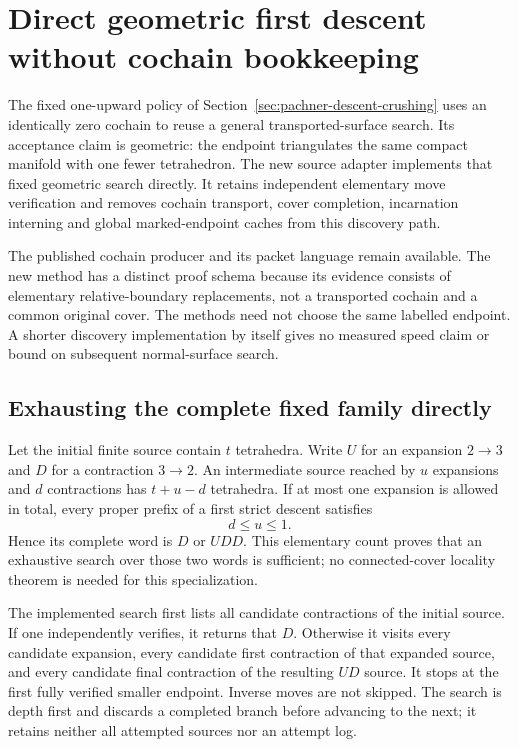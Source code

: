\section{Direct geometric first descent without cochain bookkeeping}
\label{sec:geometric-descent-crushing}

The fixed one-upward policy of
Section~\ref{sec:pachner-descent-crushing} uses an identically zero
cochain to reuse a general transported-surface search.  Its acceptance
claim is geometric: the endpoint triangulates the same compact manifold
with one fewer tetrahedron.  The new source adapter
 implements that fixed geometric
search directly.  It retains independent elementary move verification
and removes cochain transport, cover completion, incarnation interning
and global marked-endpoint caches from this discovery path.

The published cochain producer and its packet language remain available.
The new method has a distinct proof schema because its evidence consists
of elementary relative-boundary replacements, not a transported cochain
and a common original cover.  The methods need not choose the same
labelled endpoint.  A shorter discovery implementation by itself gives
no measured speed claim or bound on subsequent normal-surface search.

\subsection{Exhausting the complete fixed family directly}

Let the initial finite source contain $t$ tetrahedra.  Write $U$ for an
expansion $2\to3$ and $D$ for a contraction $3\to2$.  An intermediate
source reached by $u$ expansions and $d$ contractions has $t+u-d$
tetrahedra.  If at most one expansion is allowed in total, every proper
prefix of a first strict descent satisfies
\[
                              d\le u\le1.
\]
Hence its complete word is $D$ or $UDD$.  This elementary count proves
that an exhaustive search over those two words is sufficient; no
connected-cover locality theorem is needed for this specialization.

The implemented search first lists all candidate contractions of the
initial source.  If one independently verifies, it returns that $D$.
Otherwise it visits every candidate expansion, every candidate first
contraction of that expanded source, and every candidate final
contraction of the resulting $UD$ source.  It stops at the first fully
verified smaller endpoint.  Inverse moves are not skipped.  The search
is depth first and discards a completed branch before advancing to the
next; it retains neither all attempted sources nor an attempt log.

